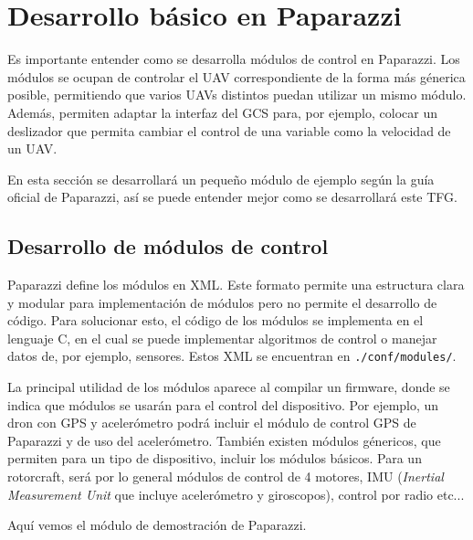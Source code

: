 \section{Desarrollo básico en Paparazzi}

Es importante entender como se desarrolla módulos de control en Paparazzi. 
Los módulos se ocupan de controlar el UAV correspondiente de la forma más génerica posible,
permitiendo que varios UAVs distintos puedan utilizar un mismo módulo. 
Además, permiten adaptar la interfaz del GCS para, por ejemplo, colocar un deslizador que permita cambiar el control de una variable como la velocidad de un UAV.

En esta sección se desarrollará un pequeño módulo de ejemplo según la guía oficial \cite{modules-paparazzi}
de Paparazzi, así se puede entender mejor como se desarrollará este TFG.


\subsection{Desarrollo de módulos de control}

Paparazzi define los módulos en XML. 
Este formato permite una estructura clara y modular para implementación de módulos pero no permite el desarrollo de código. 
Para solucionar esto, el código de los módulos se implementa en el lenguaje C, 
en el cual se puede implementar algoritmos de control o manejar datos de, por ejemplo, sensores. Estos XML se encuentran en \texttt{./conf/modules/}.

La principal utilidad de los módulos aparece al compilar un firmware, donde se indica que módulos se usarán para el control del dispositivo. 
Por ejemplo, un dron con GPS y acelerómetro podrá incluir el módulo de control GPS de Paparazzi y de uso del acelerómetro. 
También existen módulos génericos, que permiten para un tipo de dispositivo, incluir los módulos básicos. 
Para un rotorcraft, será por lo general módulos de control de 4 motores, IMU 
(\textit{Inertial Measurement Unit} que incluye acelerómetro y giroscopos), control por radio etc...

Aquí vemos el módulo de demostración de Paparazzi.

